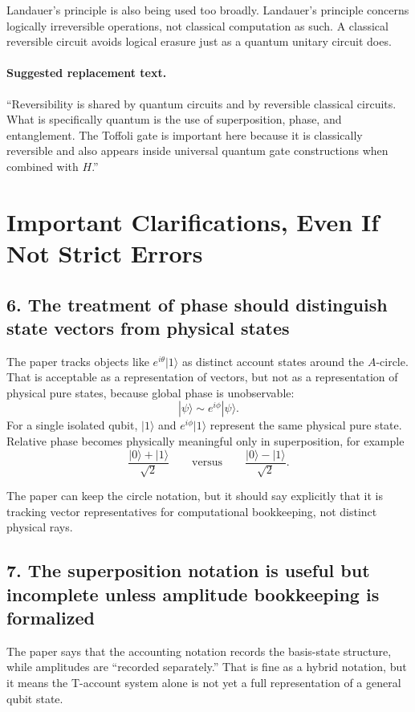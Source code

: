 \documentclass[11pt]{article}
\begin{document}
Landauer's principle is also being used too broadly. Landauer's principle concerns logically irreversible operations, not classical computation as such. A classical reversible circuit avoids logical erasure just as a quantum unitary circuit does.

\paragraph{Suggested replacement text.}
``Reversibility is shared by quantum circuits and by reversible classical circuits. What is specifically quantum is the use of superposition, phase, and entanglement. The Toffoli gate is important here because it is classically reversible and also appears inside universal quantum gate constructions when combined with \(H\).''

\section*{Important Clarifications, Even If Not Strict Errors}

\subsection*{6. The treatment of phase should distinguish state vectors from physical states}

The paper tracks objects like \(e^{i\theta}|1\rangle\) as distinct account states around the \(A\)-circle. That is acceptable as a representation of vectors, but not as a representation of physical pure states, because global phase is unobservable:
\[
|\psi\rangle \sim e^{i\phi}|\psi\rangle.
\]
For a single isolated qubit, \(|1\rangle\) and \(e^{i\phi}|1\rangle\) represent the same physical pure state. Relative phase becomes physically meaningful only in superposition, for example
\[
\frac{|0\rangle+|1\rangle}{\sqrt2}
\qquad \text{versus} \qquad
\frac{|0\rangle-|1\rangle}{\sqrt2}.
\]

The paper can keep the circle notation, but it should say explicitly that it is tracking vector representatives for computational bookkeeping, not distinct physical rays.

\subsection*{7. The superposition notation is useful but incomplete unless amplitude bookkeeping is formalized}

The paper says that the accounting notation records the basis-state structure, while amplitudes are ``recorded separately.'' That is fine as a hybrid notation, but it means the T-account system alone is not yet a full representation of a general qubit state.
\end{document}
